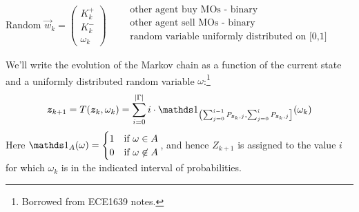Random $\vec{w}_{k} = \begin{pmatrix}
K_k^+ \\
K_k^- \\
\omega_k
\end{pmatrix} \qquad \begin{matrix}
\text{other agent buy MOs - binary} \\
\text{other agent sell MOs - binary} \\
\text{random variable uniformly distributed on [0,1]} \\
\end{matrix}$

We'll write the evolution of the Markov chain as a function of the current state and a uniformly distributed random variable $\omega$:\footnote{Borrowed from ECE1639 notes.}
\begin{equation}
\bz_{k+1} = T(\bz_k, \omega_k) = \sum_{i=0}^{|\Gamma|} i \cdot \indicator_{\left( \sum_{j=0}^{i-1} P_{\bz_k,j} , \sum_{j=0}^{i} P_{\bz_k,j} \right]} (\omega_k)
\end{equation}
Here $\indicator_A(\omega) = \begin{cases} 1 & \text{if } \omega \in A \\
0 & \text{if } \omega \not\in A
\end{cases}$, and hence $Z_{k+1}$ is assigned to the value $i$ for which $\omega_k$ is in the indicated interval of probabilities.

